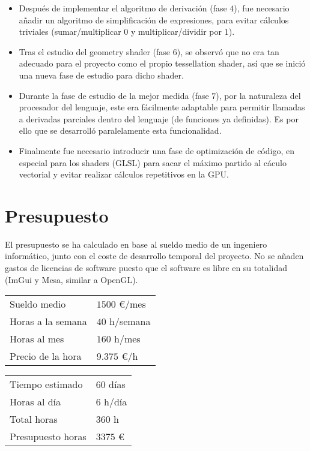 \begin{itemize}
	\item Después de implementar el algoritmo de derivación (fase $4$), fue necesario añadir un algoritmo de simplificación de expresiones, para evitar cálculos triviales (sumar/multiplicar $0$ y multiplicar/dividir por $1$).
	\item Tras el estudio del geometry shader (fase $6$), se observó que no era tan adecuado para el proyecto como el propio tessellation shader, así que se inició una nueva fase de estudio para dicho shader.
	\item Durante la fase de estudio de la mejor medida (fase $7$), por la naturaleza del procesador del lenguaje, este era fácilmente adaptable para permitir llamadas a derivadas parciales dentro del lenguaje (de funciones ya definidas). Es por ello que se desarrolló paralelamente esta funcionalidad.
	\item Finalmente fue necesario introducir una fase de optimización de código, en especial para los shaders (GLSL) para sacar el máximo partido al cáculo vectorial y evitar realizar cálculos repetitivos en la GPU.
\end{itemize}

\section{Presupuesto}

El presupuesto se ha calculado en base al sueldo medio de un ingeniero informático, junto con el coste de desarrollo temporal del proyecto. No se añaden gastos de licencias de software puesto que el software es libre en su totalidad (ImGui y Mesa, similar a OpenGL).\\

\begin{tabular}{| p{4cm} | p{2.2cm} |}
\hline
Sueldo medio & $1500$ €/mes\\
Horas a la semana & $40$ h/semana\\
Horas al mes & $160$ h/mes\\
\hline
Precio de la hora & $9.375$ €/h\\
\hline
\end{tabular}
\quad
\begin{tabular}{| p{4cm} | p{1.5cm} |}
\hline
Tiempo estimado & $60$ días\\
Horas al día & $6$ h/día\\
Total horas & $360$ h\\
\hline
Presupuesto horas & $3375$ €\\
\hline
\end{tabular}

